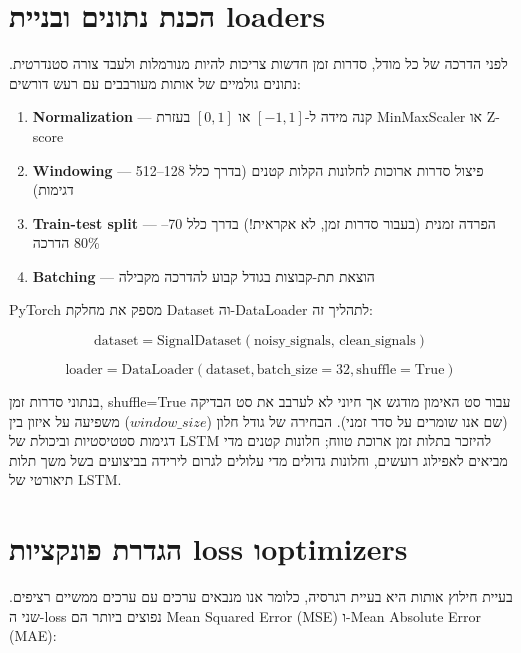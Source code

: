 \section{הכנת נתונים ובניית loaders}

לפני הדרכה של כל מודל, סדרות זמן חדשות צריכות להיות מנורמלות ולעבד צורה סטנדרטית. נתונים גולמיים של אותות מעורבבים עם רעש דורשים:

\begin{enumerate}
\item \textenglish{\textbf{Normalization}} --- קנה מידה ל-\([-1, 1]\) או \([0, 1]\) בעזרת MinMaxScaler או Z-score
\item \textenglish{\textbf{Windowing}} --- פיצול סדרות ארוכות לחלונות הקלות קטנים (בדרך כלל 128--512 דגימות)
\item \textenglish{\textbf{Train-test split}} --- הפרדה זמנית (בעבור סדרות זמן, לא אקראית!) בדרך כלל 70--80\% הדרכה
\item \textenglish{\textbf{Batching}} --- הוצאת תת-קבוצות בגודל קבוע להדרכה מקבילה
\end{enumerate}

PyTorch מספק את מחלקת \textenglish{Dataset} וה-\textenglish{DataLoader} לתהליך זה:

\begin{equation}
\text{dataset} = \text{SignalDataset}(\text{noisy\_signals, clean\_signals})
\end{equation}

\begin{equation}
\text{loader} = \text{DataLoader}(\text{dataset}, \text{batch\_size}=32, \text{shuffle}=\text{True})
\end{equation}

בנתוני סדרות זמן, \textenglish{shuffle=True} עבור סט האימון מודגש אך חיוני לא לערבב את סט הבדיקה (שם אנו שומרים על סדר זמני). הבחירה של גודל חלון (\textenglish{$window\_size$}) משפיעה על איזון בין דגימות סטטיסטיות וביכולת של LSTM להיזכר בתלות זמן ארוכת טווח; חלונות קטנים מדי מביאים לאפילוג רועשים, וחלונות גדולים מדי עלולים לגרום לירידה בביצועים בשל משך תלות תיאורטי של LSTM.

\section{הגדרת פונקציות loss וoptimizers}

בעיית חילוץ אותות היא בעיית רגרסיה, כלומר אנו מנבאים ערכים עם ערכים ממשיים רציפים. שני ה-loss נפוצים ביותר הם \textenglish{Mean Squared Error} (MSE) ו-\textenglish{Mean Absolute Error} (MAE):

